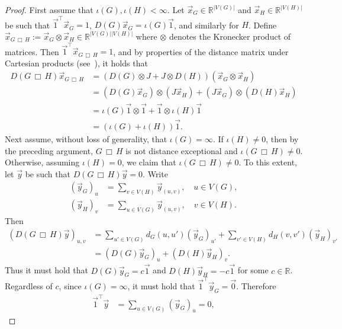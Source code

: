 \documentclass[11pt,a4paper]{article}
\newcommand{\distmatrix}{D}
\newcommand{\x}{\vec{x}}
\newcommand{\y}{\vec{y}}
\newcommand{\one}{\vec{1}}
\begin{document}
    \begin{proof}
        First assume that $\iota(G), \iota(H) < \infty$. Let $\x_G\in\mathbb{R}^{|V(G)|}$ and $\x_H\in\mathbb{R}^{|V(H)|}$ be such that $\one^\top\x_G = 1$, $\distmatrix(G)\x_G = \iota(G)\one$, and similarly for $H$. Define $\x_{{G\,\Box\, H}} := \x_G \otimes \x_H \in \mathbb{R}^{|V(G)||V(H)|}$ where $\otimes$ denotes the Kronecker product of matrices. Then $\one^\top\x_{{G\,\Box\, H}} = 1$, and by properties of the distance matrix under Cartesian products (see~\cite{bapat2019onCartesian}), it holds that
            \begin{align*}
                \distmatrix({G\,\Box\, H})\x_{{G\,\Box\, H}} &= (\distmatrix(G)\otimes J + J \otimes \distmatrix(H))(\x_G \otimes \x_H)\\
                &= (\distmatrix(G)\x_G) \otimes (J\x_H) + (J\x_G) \otimes (\distmatrix(H)\x_H)\\
                &= \iota(G)\one \otimes \one + \one \otimes \iota(H)\one\\
                &= (\iota(G) + \iota(H))\one.
            \end{align*}
        Next assume, without loss of generality, that $\iota(G) = \infty$. If $\iota(H)\ne 0$, then by the preceding argument, $G\,\Box\,H$ is not distance exceptional and $\iota(G\,\Box\, H) \ne 0$. Otherwise, assuming $\iota(H) = 0$, we claim that $\iota(G\,\Box\, H) \ne 0$. To this extent, let $\y$ be such that $\distmatrix({G\,\Box\, H})\y = 0$. Write
            \begin{align*}
                (\y_G)_{u} &= \sum_{v\in V(H)} \y_{(u,v)},\quad u\in V(G),\\
                (\y_H)_{v} &= \sum_{u\in V(G)} \y_{(u,v)},\quad v\in V(H).
            \end{align*}
        Then
            \begin{align*}
                (\distmatrix({G\,\Box\, H})\y)_{u, v} &= \sum_{u'\in V(G)} d_G(u, u') (\y_G)_{u'} + \sum_{v'\in V(H)} d_H(v, v') (\y_H)_{v'}\\
                &= (\distmatrix(G) \y_G)_{u} + (\distmatrix(H) \y_H)_{v}.
            \end{align*}
        Thus it must hold that $\distmatrix(G) \y_G = c\one$ and $\distmatrix(H) \y_H = -c\one$ for some $c\in\mathbb{R}$. Regardless of $c$, since $\iota(G) = \infty$, it must hold that $\one^\top \y_G = \vec{0}$. Therefore
            \begin{align*}
                \one^\top \y &= \sum_{u\in V(G)} (\y_G)_u = 0,

\end{align*}
\end{proof}
\end{document}
